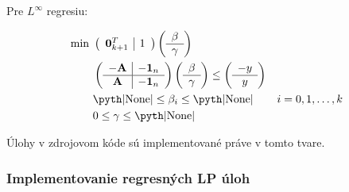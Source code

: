\documentclass[12pt,oneside,a4paper,slovak]{article}
\begin{document}
Pre $L^{\infty}$ regresiu:

\begin{align*}
	\text{min}~ &
	\left(
	\begin{array}{c|c}
		\mathbf{0}_{k+1}^T & 1
	\end{array}
	\right)
	\left(
	\begin{array}{c}
		\beta \\
		\hline
		\gamma
	\end{array}
	\right) \\
	&\left(
	\begin{array}{c|c}
		-\mathbf{A} & -\mathbf{1}_n \\
		\hline
		\mathbf{A} & -\mathbf{1}_n
	\end{array}
	\right)
	\left(
	\begin{array}{c}
		\beta \\
		\hline
		\gamma
	\end{array}
	\right)
	\leq
	\left(
	\begin{array}{c}
		-y \\
		\hline
		y
	\end{array}
	\right) \\
	&\text{\pyth|None|} \leq \beta_i \leq \text{\pyth|None|} &i = 0,1,\dots,k\\
	&0 \leq \gamma \leq \text{\pyth|None|}
\end{align*}

Úlohy v zdrojovom kóde sú implementované práve v tomto tvare.

\subsubsection*{Implementovanie regresných LP úloh}
\end{document}
